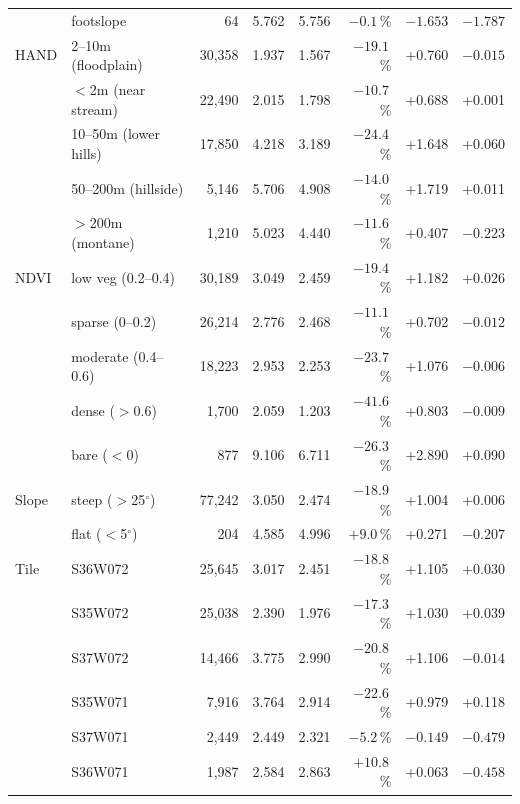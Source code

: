 \begin{table}[t]
{\begin{tabular}{llrrrrrr}
 & footslope & 64 & 5.762 & 5.756 & $-0.1$\,\% & $-1.653$ & $-1.787$ \\
\addlinespace[2pt]
HAND & 2--10m (floodplain) & 30,358 & 1.937 & 1.567 & $-19.1$\,\% & +0.760 & $-0.015$ \\
 & $<$2m (near stream) & 22,490 & 2.015 & 1.798 & $-10.7$\,\% & +0.688 & +0.001 \\
 & 10--50m (lower hills) & 17,850 & 4.218 & 3.189 & $-24.4$\,\% & +1.648 & +0.060 \\
 & 50--200m (hillside) & 5,146 & 5.706 & 4.908 & $-14.0$\,\% & +1.719 & +0.011 \\
 & $>$200m (montane) & 1,210 & 5.023 & 4.440 & $-11.6$\,\% & +0.407 & $-0.223$ \\
\addlinespace[2pt]
NDVI & low veg (0.2--0.4) & 30,189 & 3.049 & 2.459 & $-19.4$\,\% & +1.182 & +0.026 \\
 & sparse (0--0.2) & 26,214 & 2.776 & 2.468 & $-11.1$\,\% & +0.702 & $-0.012$ \\
 & moderate (0.4--0.6) & 18,223 & 2.953 & 2.253 & $-23.7$\,\% & +1.076 & $-0.006$ \\
 & dense ($>$0.6) & 1,700 & 2.059 & 1.203 & $-41.6$\,\% & +0.803 & $-0.009$ \\
 & bare ($<$0) & 877 & 9.106 & 6.711 & $-26.3$\,\% & +2.890 & +0.090 \\
\addlinespace[2pt]
Slope & steep ($>$25$^{\circ}$) & 77,242 & 3.050 & 2.474 & $-18.9$\,\% & +1.004 & +0.006 \\
 & flat ($<$5$^{\circ}$) & 204 & 4.585 & 4.996 & $+9.0$\,\% & +0.271 & $-0.207$ \\
\addlinespace[2pt]
Tile & S36W072 & 25,645 & 3.017 & 2.451 & $-18.8$\,\% & +1.105 & +0.030 \\
 & S35W072 & 25,038 & 2.390 & 1.976 & $-17.3$\,\% & +1.030 & +0.039 \\
 & S37W072 & 14,466 & 3.775 & 2.990 & $-20.8$\,\% & +1.106 & $-0.014$ \\
 & S35W071 & 7,916 & 3.764 & 2.914 & $-22.6$\,\% & +0.979 & +0.118 \\
 & S37W071 & 2,449 & 2.449 & 2.321 & $-5.2$\,\% & $-0.149$ & $-0.479$ \\
 & S36W071 & 1,987 & 2.584 & 2.863 & $+10.8$\,\% & +0.063 & $-0.458$ \\
\bottomrule
\end{tabular}%
}
\end{table}
